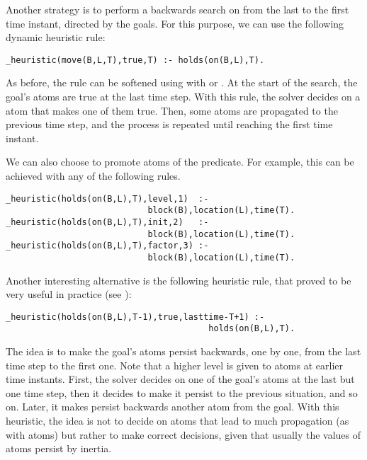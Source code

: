 Another strategy is to perform a backwards search on  from the last to the
first time instant, directed by the goals. 
For this purpose, we can use the following dynamic heuristic rule: 
\begin{lstlisting}[basicstyle=\small\ttfamily,numbers=none]
_heuristic(move(B,L,T),true,T) :- holds(on(B,L),T).
\end{lstlisting}
As before, the rule can be softened using  with  or .
At the start of the search, the goal's  atoms are true at the last time step.
With this rule, the solver decides on a  atom that makes one of them true.
Then, some  atoms are propagated to the previous time step,
and the process is repeated until reaching the first time instant.

We can also choose to promote atoms of the  predicate.  
For example, this can be achieved with any of the  following rules.
\begin{lstlisting}[basicstyle=\small\ttfamily,numbers=none]
_heuristic(holds(on(B,L),T),level,1)  :- 
                            block(B),location(L),time(T).
_heuristic(holds(on(B,L),T),init,2)   :- 
                            block(B),location(L),time(T).
_heuristic(holds(on(B,L),T),factor,3) :- 
                            block(B),location(L),time(T).
\end{lstlisting}

Another interesting alternative is the following heuristic rule,  
that proved to be very useful in practice (see \cite{gekaotroscwa13a}):
\begin{lstlisting}[basicstyle=\small\ttfamily,numbers=none]
_heuristic(holds(on(B,L),T-1),true,lasttime-T+1) :- 
                                        holds(on(B,L),T). 
\end{lstlisting}
The idea is to make the goal's  atoms persist backwards, 
one by one, from the last time step to the first one.
Note that a higher level is given to atoms at earlier time instants.
First, the solver decides on one of the goal's  atoms at the last but one time step,
then it decides to make it persist to the previous situation, and so on.
Later, it makes persist backwards another  atom from the goal.
With this heuristic,
the idea is not to decide on atoms that lead to much propagation (as with  atoms)
but rather to make correct decisions, 
given that usually the values of  atoms persist by inertia.


